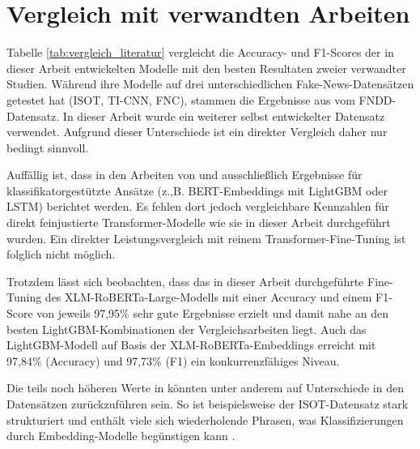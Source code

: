 \section{Vergleich mit verwandten Arbeiten}

Tabelle \ref{tab:vergleich_literatur} vergleicht die Accuracy- und F1-Scores der in dieser Arbeit entwickelten Modelle mit den besten Resultaten zweier 
verwandter Studien. Während \cite{Essa:2023aa} ihre Modelle auf drei unterschiedlichen Fake-News-Datensätzen getestet hat 
(ISOT, TI-CNN, FNC), stammen die Ergebnisse aus \cite{V_G_2024} vom FNDD-Datensatz. In dieser Arbeit wurde ein weiterer selbst entwickelter Datensatz verwendet. 
Aufgrund dieser Unterschiede ist ein direkter Vergleich daher nur bedingt sinnvoll.

Auffällig ist, dass in den Arbeiten von \cite{Essa:2023aa} und \cite{V_G_2024} ausschließlich Ergebnisse für klassifikatorgestützte Ansätze 
(z.,B. BERT-Embeddings mit LightGBM oder LSTM) berichtet werden. Es fehlen dort jedoch vergleichbare Kennzahlen für direkt feinjustierte Transformer-Modelle 
wie sie in dieser Arbeit durchgeführt wurden. Ein direkter Leistungsvergleich mit reinem Transformer-Fine-Tuning ist folglich nicht möglich.

Trotzdem lässt sich beobachten, dass das in dieser Arbeit durchgeführte Fine-Tuning des XLM-RoBERTa-Large-Modells mit einer Accuracy und einem F1-Score von 
jeweils 97,95\% sehr gute Ergebnisse erzielt und damit nahe an den besten LightGBM-Kombinationen der Vergleichsarbeiten liegt. 
Auch das LightGBM-Modell auf Basis der XLM-RoBERTa-Embeddings erreicht mit 97,84\% (Accuracy) und 97,73\% (F1) ein konkurrenzfähiges Niveau.

Die teils noch höheren Werte in \cite{Essa:2023aa} könnten unter anderem auf Unterschiede in den Datensätzen zurückzuführen sein. 
So ist beispielsweise der ISOT-Datensatz stark strukturiert und enthält viele sich wiederholende Phrasen, was Klassifizierungen durch Embedding-Modelle begünstigen kann \cite{s22186970}. 

